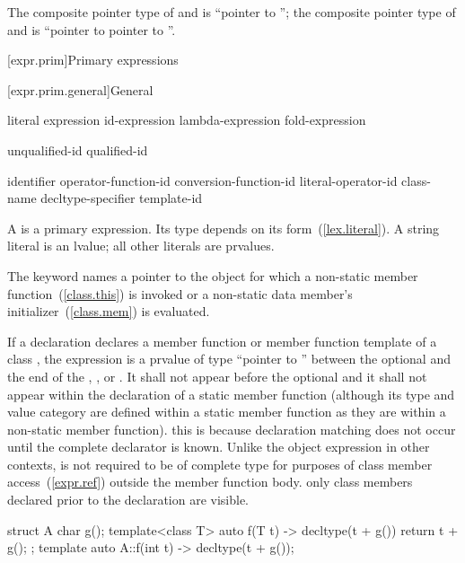 The composite pointer type of  and  is ``pointer to ''; the
composite pointer type of  and  is ``pointer to  pointer to
''.
\exitexample

[expr.prim]{Primary expressions}%

[expr.prim.general]{General}

\begin{bnf}
\br
    literal\br
    \br
    \terminal{(} expression \terminal{)}\br
    id-expression\br
    lambda-expression\br
    fold-expression
\end{bnf}

\begin{bnf}
\br
    unqualified-id\br
    qualified-id
\end{bnf}

\begin{bnf}
\br
    identifier\br
    operator-function-id\br
    conversion-function-id\br
    literal-operator-id\br
    \terminal{\tilde} class-name\br
    \terminal{\tilde} decltype-specifier\br
    template-id
\end{bnf}

\pnum
A
%
%
is a primary expression.
Its type depends on its form~(\ref{lex.literal}).
A string literal is an lvalue; all other literals are prvalues.

\pnum
{}%
The keyword  names a pointer to the object for which a non-static member
function~(\ref{class.this}) is invoked or a non-static data member's
initializer~(\ref{class.mem}) is evaluated.

\pnum
If a declaration declares a member function or member function template of a
class , the expression  is a prvalue of type ``pointer to
 '' between the optional
 and the end of the ,
, or . It shall not appear
before the optional  and it shall not appear within
the declaration of a static member function (although its type and value category
are defined within a static member function as they are within a non-static
member function). \enternote this is because declaration matching does not
occur until the complete declarator is known. \exitnote Unlike the object
expression in other contexts,  is not required to be of complete
type for purposes of class member access~(\ref{expr.ref}) outside the member
function body. \enternote only class members declared prior to the declaration
are visible. \exitnote
\enterexample
\begin{codeblock}
struct A {
  char g();
  template<class T> auto f(T t) -> decltype(t + g())
    { return t + g(); }
};
template auto A::f(int t) -> decltype(t + g());
\end{codeblock}
\exitexample

